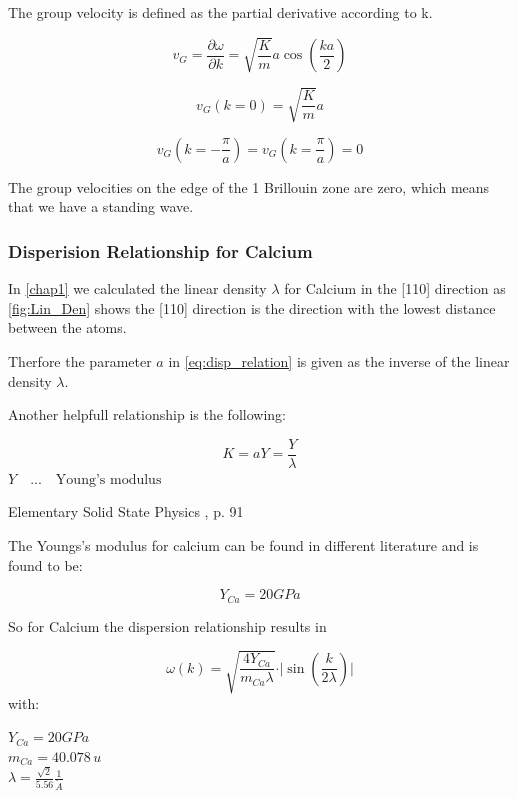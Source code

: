 The group velocity is defined as the partial derivative according to k.

$$v_G = \frac{\partial \omega}{\partial k} = 
     \sqrt{\frac{K}{m}} a \cos\left(\frac{ka}{2} \right)$$

$$v_G(k=0) = \sqrt{\frac{K}{m}} a$$

$$v_G\left(k=-\frac{\pi}{a}\right)= v_G\left(k=\frac{\pi}{a}\right) = 0$$

The group velocities on the edge of the 1 Brillouin zone are zero, which means that we have a standing wave.

\subsubsection*{Disperision Relationship for Calcium}

In \autoref{chap1} we calculated the linear density $\lambda$ for Calcium in the [110]
direction as \autoref{fig:Lin_Den} shows the [110] direction is the 
direction with the lowest distance between the atoms.

Therfore the parameter $a$ in \autoref{eq:disp_relation} is given as the
inverse of the linear density $\lambda$.


Another helpfull relationship is the following:

\begin{equation}
    K = aY = \frac{Y}{\lambda}
\end{equation}
$Y  \quad ... \quad \textrm{Young's modulus}$

Elementary Solid State Physics \cite{elementary_SSP}, p. 91

The Youngs's modulus for calcium can be found in different literature  \cite{web_elem_calcium} and is found to be:

$$Y_{Ca} = 20 GPa$$

So for Calcium the dispersion relationship results in 

\begin{equation}
    \omega(k) = \sqrt{\frac{4 Y_{Ca}}{m_{Ca} \lambda}} \cdot \vert \sin \left(\frac{k}{2\lambda} \right) \vert
\end{equation}
with:
\begin{addmargin}[4em]{1em}
    $Y_{Ca} = 20 GPa$\\
    $m_{Ca} = 40.078 \, u$\\
    $\lambda = \frac{\sqrt{2}}{5.56} \frac{1}{\mathring{A}}$
\end{addmargin}


